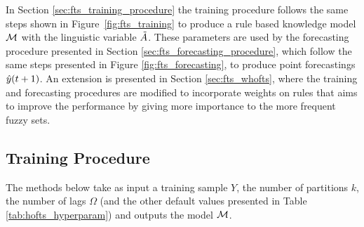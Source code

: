 \index{$\model$}
In Section \ref{sec:fts_training_procedure} the training procedure follows the same steps shown in Figure~\ref{fig:fts_training} to produce a rule based knowledge model $\model$ with the linguistic variable $\tilde{A}$. These parameters are used by the forecasting procedure presented in Section \ref{sec:fts_forecasting_procedure}, which follow the same steps presented in Figure \ref{fig:fts_forecasting}, to produce point forecastings $\hat{y}(t+1)$. An extension is presented in Section \ref{sec:fts_whofts}, where the training and forecasting procedures are modified to incorporate weights on rules that aims to improve the performance by giving more importance to the more frequent fuzzy sets. 

%
\subsection{Training Procedure}
\label{sec:fts_training_procedure}

The methods below take as input a training sample $Y$, the number of partitions $k$, the number of lags $\Omega$ (and the other default values presented in Table \ref{tab:hofts_hyperparam}) and outputs the model $\model$.
\index{$\model$}


